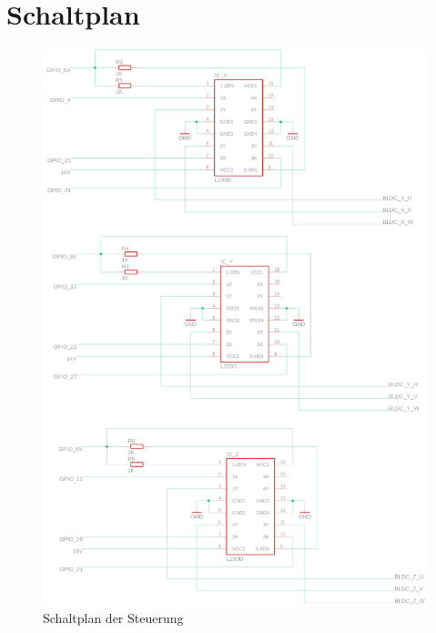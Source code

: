 \documentclass[12pt,a4paper,bibliography=totocnumbered,listof=totocnumbered]{scrartcl}
\begin{document}
\section{Schaltplan}
\begin{figure}[th]
	\centering
	\includegraphics[width=0.7\linewidth]{ICschaltung.png}
	\caption{Schaltplan der Steuerung}
	\label{fig:mikrocontroller-schaltung}
\end{figure}
\renewcommand\refname{Literaturverzeichnis}



\newpage


\listoffigures

\listoftables
\end{document}

